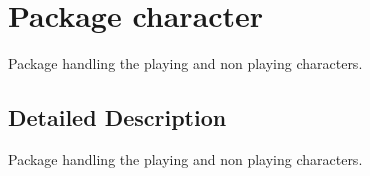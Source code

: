 \hypertarget{namespacecharacter}{\section{Package character}
\label{namespacecharacter}
}


Package handling the playing and non playing characters.  




\subsection{Detailed Description}
Package handling the playing and non playing characters. 
